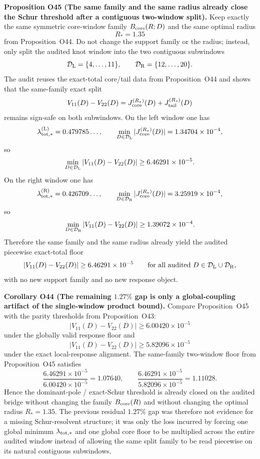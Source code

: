 \documentclass[aps,prd,onecolumn,notitlepage,nofootinbib,superscriptaddress,11pt,floatfix]{revtex4-2}
\begin{document}
\medskip\noindent\textbf{Proposition O45 (The same family and the same radius already close the Schur threshold after a contiguous two-window split).}
Keep exactly the same symmetric core-window family \(B_{\rm core}(R;D)\) and the same optimal radius
\[
R_\ast=1.35
\]
from Proposition~O44.  Do not change the support family or the radius; instead, only split the audited knot window into the two contiguous subwindows
\[
\mathcal D_{\rm L}=\{4,\dots,11\},
\qquad
\mathcal D_{\rm R}=\{12,\dots,20\}.
\]
The audit
reuses the exact-total core/tail data from Proposition~O44 and shows that the same-family exact split
\[
V_{11}(D)-V_{22}(D)=J_{\rm core}^{(R_\ast)}(D)+J_{\rm tail}^{(R_\ast)}(D)
\]
remains sign-safe on both subwindows.  On the left window one has
\[
\lambda_{{\rm tot},\ast}^{\rm(L)}
=
0.479785\ldots,
\qquad
\min_{D\in\mathcal D_{\rm L}}|J_{\rm core}^{(R_\ast)}(D)|
=
1.34704\times10^{-4},
\]
so
\[
\min_{D\in\mathcal D_{\rm L}}|V_{11}(D)-V_{22}(D)|
\ge
6.46291\times10^{-5}.
\]
On the right window one has
\[
\lambda_{{\rm tot},\ast}^{\rm(R)}
=
0.426709\ldots,
\qquad
\min_{D\in\mathcal D_{\rm R}}|J_{\rm core}^{(R_\ast)}(D)|
=
3.25919\times10^{-4},
\]
so
\[
\min_{D\in\mathcal D_{\rm R}}|V_{11}(D)-V_{22}(D)|
\ge
1.39072\times10^{-4}.
\]
Therefore the same family and the same radius already yield the audited piecewise exact-total floor
\[
|V_{11}(D)-V_{22}(D)|
\ge
6.46291\times10^{-5}
\qquad
\text{for all audited }D\in\mathcal D_{\rm L}\cup\mathcal D_{\rm R},
\]
with no new support family and no new response object.

\medskip\noindent\textbf{Corollary O44 (The remaining \(1.27\%\) gap is only a global-coupling artifact of the single-window product bound).}
Compare Proposition~O45 with the parity thresholds from Proposition~O43:
\[
|V_{11}(D)-V_{22}(D)|\ge 6.00420\times10^{-5}
\]
under the globally valid response floor and
\[
|V_{11}(D)-V_{22}(D)|\ge 5.82096\times10^{-5}
\]
under the exact local-response alignment.  The same-family two-window floor from Proposition~O45 satisfies
\[
\frac{6.46291\times10^{-5}}{6.00420\times10^{-5}}
=
1.07640,
\qquad
\frac{6.46291\times10^{-5}}{5.82096\times10^{-5}}
=
1.11028.
\]
Hence the dominant-pole / exact-Schur threshold is already closed on the audited bridge without changing the family \(B_{\rm core}(R)\) and without changing the optimal radius \(R_\ast=1.35\).  The previous residual \(1.27\%\) gap was therefore not evidence for a missing Schur-resolvent structure; it was only the loss incurred by forcing one global minimum \(\lambda_{{\rm tot},\ast}\) and one global core floor to be multiplied across the entire audited window instead of allowing the same split family to be read piecewise on its natural contiguous subwindows.
\end{document}
